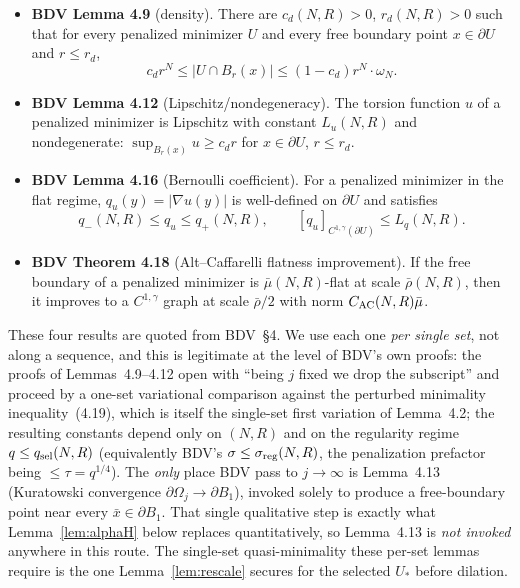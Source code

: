 \documentclass[11pt]{article}
\theoremstyle{definition}
\newcommand{\abs}[1]{\left|#1\right|}
\begin{document}
\begin{itemize}
\item \textbf{BDV Lemma 4.9} (density). There are
$c_d(N,R)>0$, $r_d(N,R)>0$ such that for every penalized minimizer $U$ and
every free boundary point $x\in\partial U$ and $r\le r_d$,
\[
c_d r^N\le\abs{U\cap B_r(x)}\le(1-c_d)r^N\cdot\omega_N.
\]

\item \textbf{BDV Lemma 4.12} (Lipschitz/nondegeneracy). The torsion
function $u$ of a penalized minimizer is Lipschitz with constant $L_u(N,R)$
and nondegenerate: $\sup_{B_r(x)}u\ge c_d r$ for $x\in\partial U$, $r\le r_d$.

\item \textbf{BDV Lemma 4.16} (Bernoulli coefficient). For a penalized
minimizer in the flat regime, $q_u(y)=\abs{\nabla u(y)}$ is well-defined on
$\partial U$ and satisfies
\[
q_-(N,R)\le q_u\le q_+(N,R),\qquad[q_u]_{C^{1,\gamma}(\partial U)}\le L_q(N,R).
\]

\item \textbf{BDV Theorem 4.18} (Alt--Caffarelli flatness improvement). If
the free boundary of a penalized minimizer is $\bar\mu(N,R)$-flat at scale
$\bar\rho(N,R)$, then it improves to a $C^{1,\gamma}$ graph at scale
$\bar\rho/2$ with norm $C_{\rm AC}(N,R)\bar\mu$.
\end{itemize}

These four results are quoted from BDV~\S 4. We use each one \emph{per single
set}, not along a sequence, and this is legitimate at the level of BDV's own
proofs: the proofs of Lemmas~4.9--4.12 open with ``being $j$ fixed we drop the
subscript'' and proceed by a one-set variational comparison against the
perturbed minimality inequality~(4.19), which is itself the single-set first
variation of Lemma~4.2; the resulting constants depend only on $(N,R)$ and on
the regularity regime $q\le q_{\rm sel}(N,R)$ (equivalently BDV's
$\sigma\le\sigma_{\rm reg}(N,R)$, the penalization prefactor being
$\le\tau=q^{1/4}$). The \emph{only} place BDV pass to $j\to\infty$ is
Lemma~4.13 (Kuratowski convergence $\partial\Omega_j\to\partial B_1$), invoked
solely to produce a free-boundary point near every $\bar x\in\partial B_1$.
That single qualitative step is exactly what Lemma~\ref{lem:alphaH} below
replaces quantitatively, so Lemma~4.13 is \emph{not invoked} anywhere in this
route. The single-set quasi-minimality these per-set lemmas require is the one
Lemma~\ref{lem:rescale} secures for the selected $U_*$ before dilation.
\end{document}

